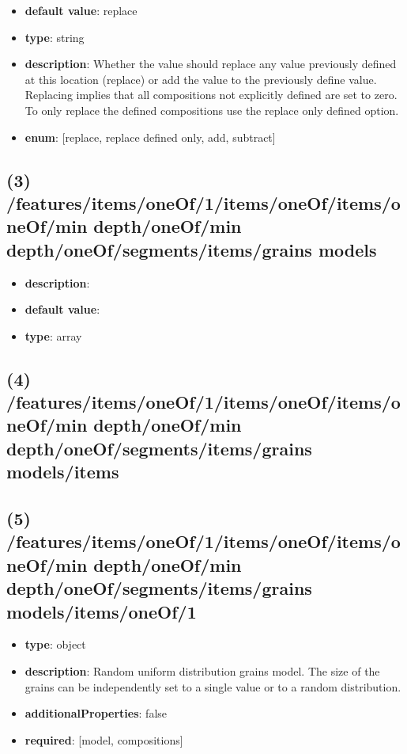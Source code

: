\begin{itemize}[leftmargin=6em]\item {\bf default value}: replace
\item {\bf type}: string
\item {\bf description}: Whether the value should replace any value previously defined at this location (replace) or add the value to the previously define value. Replacing implies that all compositions not explicitly defined are set to zero. To only replace the defined compositions use the replace only defined option.
\item {\bf enum}: [replace, replace defined only, add, subtract]\end{itemize}\subsection{(3) /features/items/oneOf/1/items/oneOf/items/oneOf/min depth/oneOf/min depth/oneOf/segments/items/grains models}
\begin{itemize}[leftmargin=3em]\item {\bf description}: 
\item {\bf default value}: 
\item {\bf type}: array
\end{itemize}\subsection{(4) /features/items/oneOf/1/items/oneOf/items/oneOf/min depth/oneOf/min depth/oneOf/segments/items/grains models/items}

\subsection{(5) /features/items/oneOf/1/items/oneOf/items/oneOf/min depth/oneOf/min depth/oneOf/segments/items/grains models/items/oneOf/1}
\begin{itemize}[leftmargin=5em]\item {\bf type}: object
\item {\bf description}: Random uniform distribution grains model. The size of the grains can be independently set to a single value or to a random distribution.
\item {\bf additionalProperties}: false
\item {\bf required}: [model, compositions]\end{itemize}
